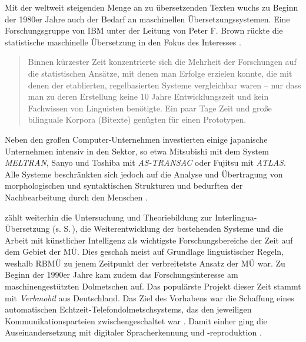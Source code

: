 Mit der weltweit steigenden Menge an zu übersetzenden Texten wuchs zu Beginn der 1980er Jahre auch der Bedarf an maschinellen Übersetzungssystemen. Eine Forschungsgruppe von IBM unter der Leitung von Peter F. Brown rückte die statistische maschinelle Übersetzung in den Fokus des Interesses \citep[7]{stein_maschinelle_2009}.


\begin{quote}

Binnen kürzester Zeit konzentrierte sich die Mehrheit der Forschungen auf die statistischen Ansätze, mit denen man Erfolge erzielen konnte, die mit denen der etablierten, regelbasierten Systeme vergleichbar waren -- nur dass man zu deren Erstellung keine 10 Jahre Entwicklungszeit und kein Fachwissen von Linguisten benötigte. Ein paar Tage Zeit und große bilinguale Korpora (Bitexte) genügten für einen Prototypen. \citep[7]{stein_maschinelle_2009}

\end{quote}


Neben den großen Computer-Unternehmen investierten einige japanische Unternehmen intensiv in den Sektor, so etwa Mitsubishi mit dem System \emph{MELTRAN}, Sanyo und Toshiba mit \emph{AS-TRANSAC} oder Fujitsu mit \emph{ATLAS}. Alle Systeme beschränkten sich jedoch auf die Analyse und Übertragung von morphologischen und syntaktischen Strukturen und bedurften der Nachbearbeitung durch den Menschen \citep[442]{hutchins_machine_1995}.

\citet[443]{hutchins_machine_1995} zählt weiterhin die Untersuchung und Theoriebildung zur Interlingua-Übersetzung (s. S.\,\pageref{K3:item:interlingua}), die Weiterentwicklung der bestehenden Systeme und die Arbeit mit künstlicher Intelligenz als wichtigste Forschungsbereiche der Zeit auf dem Gebiet der MÜ. Dies geschah meist auf Grundlage linguistischer Regeln, weshalb RBMÜ zu jenem Zeitpunkt der verbreitetste Ansatz der MÜ war. Zu Beginn der 1990er Jahre kam zudem das Forschungsinteresse am maschinengestützten Dolmetschen auf. Das populärste Projekt dieser Zeit stammt mit \emph{Verbmobil} aus Deutschland. Das Ziel des Vorhabens war die Schaffung eines automatischen Echtzeit-Telefondolmetschsystems, das den jeweiligen Kommunikationsparteien zwischengeschaltet war \citep[]{wahlster_verbmobil_2000}. Damit einher ging die Auseinandersetzung mit digitaler Spracherkennung und -reproduktion \citep[35]{krenz_maschinelle_2008}.

